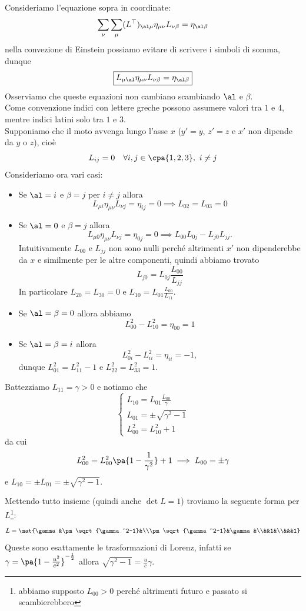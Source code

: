 \noindent Consideriamo l'equazione sopra in coordinate:
\[\sum_\nu\sum_\mu(L^\top)_{\al\mu}\eta_{\mu\nu}L_{\nu\beta}=\eta_{\al\beta}\]
nella convezione di Einstein possiamo evitare di scrivere i simboli di somma, dunque
\[\boxed{L_{\mu\al}\eta_{\mu\nu}L_{\nu\beta}=\eta_{\al\beta}}\]
Osserviamo che queste equazioni non cambiano scambiando $\al$ e $\beta$.\\
Come convenzione indici con lettere greche possono assumere valori tra $1$ e $4$, mentre indici latini solo tra $1$ e $3$.\\
Supponiamo che il moto avvenga lungo l'asse $x$ ($y'=y$, $z'=z$ e $x'$ non dipende da $y$ o $z$), cio\`e
\[L_{ij}=0 \quad \forall i,j\in\cpa{1,2,3},\ i\neq j\]
Consideriamo ora vari casi:
\begin{itemize}
\item Se $\al=i$ e $\beta=j$ per $i\neq j$ allora
\[L_{\mu i}\eta_{\mu\nu}L_{\nu j}=\eta_{ij}=0\implies L_{02}=L_{03}=0\]
\item Se $\al=0$ e $\beta=j$ allora
\[L_{\mu0}\eta_{\mu\nu}L_{\nu j}=\eta_{0j}=0\implies L_{00}L_{0j}-L_{j0}L_{jj}.\]
Intuitivamente $L_{00}$ e $L_{jj}$ non sono nulli perch\'e altrimenti $x'$ non dipenderebbe da $x$ e similmente per le altre componenti, quindi abbiamo trovato
\[L_{j0}=L_{0j}\frac{L_{00}}{L_{jj}}\]
In particolare $L_{20}=L_{30}=0$ e $L_{10}=L_{01}\frac{L_{00}}{L_{11}}$.
\item Se $\al=\beta=0$ allora abbiamo
\[L_{00}^2-L_{10}^2=\eta_{00}=1\]
\item Se $\al=\beta=i$ allora
\[L_{0i}^2-L_{ii}^2=\eta_{ii}=-1,\]
dunque $L_{01}^2=L_{11}^2-1$ e $L_{22}^2=L_{33}^2=1$.
\end{itemize}
\noindent
Battezziamo $L_{11}=\gamma>0$ e notiamo che
\[\begin{cases}
L_{10}=L_{01}\frac{L_{00}}{\gamma}\\
L_{01}=\pm\sqrt{\gamma^2-1}\\
L^2_{00}=L^2_{10}+1
\end{cases}\]
da cui
\[L_{00}^2=L_{00}^2\pa{1-\frac1{\gamma^2}}+1\implies L_{00}=\pm\gamma\]
e $L_{10}=\pm L_{01}=\pm \sqrt{\gamma^2-1}$.
\medskip

\noindent Mettendo tutto insieme (quindi anche $\det L=1$) troviamo la seguente forma per $L$\footnote{abbiamo supposto $L_{00}>0$ perch\'e altrimenti futuro e passato si scambierebbero}:
\[L=\mat{\gamma &\pm\sqrt{\gamma^2-1}&\\\pm\sqrt{\gamma^2-1}&\gamma&\\&&1&\\&&&1}\]
Queste sono esattamente le trasformazioni di Lorenz, infatti se $\gamma=\pa{1-\frac{u^2}{c^2}}^{-\frac12}$ allora $\sqrt{\gamma^2-1}=\frac uc\gamma$.



